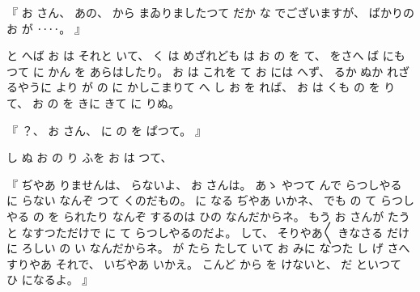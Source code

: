 %
『
お
さん、
%
あの、
%
から
まゐりましたつて
だか
な
でございますが、
%
ばかりの
お
が
‥‥。
』

%
と
へば
お
は
それと
いて、
%
く
は
めざれども
は
お
の
を
て、
%
をさへ
ば
にも
つて
に
かん
を
あらはしたり。
%
お
は
これを
て
お
には
へず、
%
るか
ぬか
%
れざるやうに
より
が
の
に
かしこまりて
へ
し
お
を
れば、
%
お
は
くも
の
を
りて、
%
お
の
を
きに
きて
に
りぬ。

%
『
？、
%
お
さん、
%
に
の
を
ぱつて。
』

%
し
ぬ
お
の
り
ふを
お
は
つて、

%
『
ぢやあ
りませんは、
%
らないよ、
%
お
さんは。
%
あゝ
やつて
んで
らつしやる
に
らない
なんぞ
つて
くのだもの。
%
に
なる
ぢやあ
いかネ、
%
でも
の
て
らつしやる
の
を
られたり
なんぞ
するのは
ひの
なんだからネ。
%
もう
お
さんが
たうと
なすつただけで%
に
%
て
らつしやるのだよ。
%
して、
%
そりやあ〳〵
きなさる%
だけに
ろしい
の
い
なんだからネ。
%
が
たら
たして
いて
お
みに
なつた
し
げ
さへ
すりやあ
それで、
%
いぢやあ
いかえ。
%
こんど
から
を
けないと、
%
だ
といつて
ひ
になるよ。
』

